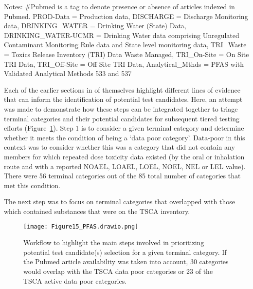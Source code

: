 \documentclass[
  super,
  preprint,
  3p]{elsarticle}
\begin{document}
Notes: \#Pubmed is a tag to denote presence or absence of articles
indexed in Pubmed. PROD-Data = Production data, DISCHARGE = Discharge
Monitoring data, DRINKING\_WATER = Drinking Water (State) Data,
DRINKING\_WATER-UCMR = Drinking Water data comprising Unregulated
Contaminant Monitoring Rule data and State level monitoring data,
TRI\_Waste = Toxics Release Inventory (TRI) Data Waste Managed,
TRI\_On-Site = On Site TRI Data, TRI\_Off-Site = Off Site TRI Data,
Analytical\_Mthds = PFAS with Validated Analytical Methods 533 and 537

Each of the earlier sections in of themselves highlight different lines
of evidence that can inform the identification of potential test
candidates. Here, an attempt was made to demonstrate how these steps can
be integrated together to triage terminal categories and their potential
candidates for subsequent tiered testing efforts
(Figure~\ref{fig-test-cand}). Step 1 is to consider a given terminal
category and determine whether it meets the condition of being a `data
poor category'. Data-poor in this context was to consider whether this
was a category that did not contain any members for which repeated dose
toxicity data existed (by the oral or inhalation route and with a
reported NOAEL, LOAEL, LOEL, NOEL, NEL or LEL value). There were 56
terminal categories out of the 85 total number of categories that met
this condition.

The next step was to focus on terminal categories that overlapped with
those which contained substances that were on the TSCA inventory.

\begin{figure}

{\centering \texttt{[image: Figure15\_PFAS.drawio.png]}

}

\caption{\label{fig-test-cand}Workflow to highlight the main steps
involved in prioritizing potential test candidate(s) selection for a
given terminal category. If the Pubmed article availability was taken
into account, 30 categories would overlap with the TSCA data poor
categories or 23 of the TSCA active data poor categories.}

\end{figure}
\end{document}

